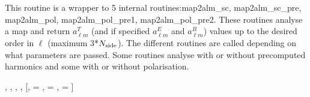 
\sloppy


 \section[map2alm*]{ }
\label{sub:map2alm}
\author{Frode K.~Hansen, Eric Hivon}

\begin{facility}
{This routine is a wrapper to 5 internal routines:map2alm\_sc,
map2alm\_sc\_pre, map2alm\_pol, map2alm\_pol\_pre1,
map2alm\_pol\_pre2. These routines analyse a  map and return
$a_{\ell m}^T$ (and if specified $a_{\ell m}^E$ and $a_{\ell m}^B$) values up to
the desired order in $\ell$ (maximum 3*$N_{\mathrm{side}}$). The different
routines are called depending on what parameters are passed. Some
routines analyse with or without precomputed harmonics and some with
or without polarisation. }
{\modAlmTools}
\end{facility}

\begin{f90format}
{%
, %
, %
, %
, %
[, =%
, =%
, =%
]}
\end{f90format}

